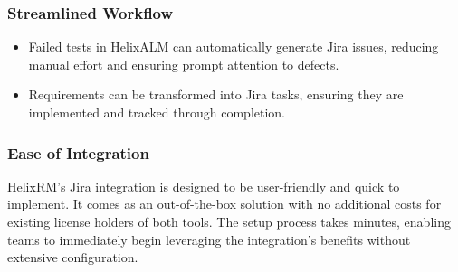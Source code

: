     \subsubsection*{Streamlined Workflow}
    \begin{itemize}
        \item Failed tests in HelixALM can automatically generate Jira issues, reducing manual effort and ensuring prompt attention to defects.
        \item Requirements can be transformed into Jira tasks, ensuring they are implemented and tracked through completion.
    \end{itemize}

    \subsubsection*{Ease of Integration}
    HelixRM’s Jira integration is designed to be user-friendly and quick to implement.
    It comes as an out-of-the-box solution with no additional costs for existing license holders of both tools.
    The setup process takes minutes, enabling teams to immediately begin leveraging the integration’s benefits without extensive configuration.
